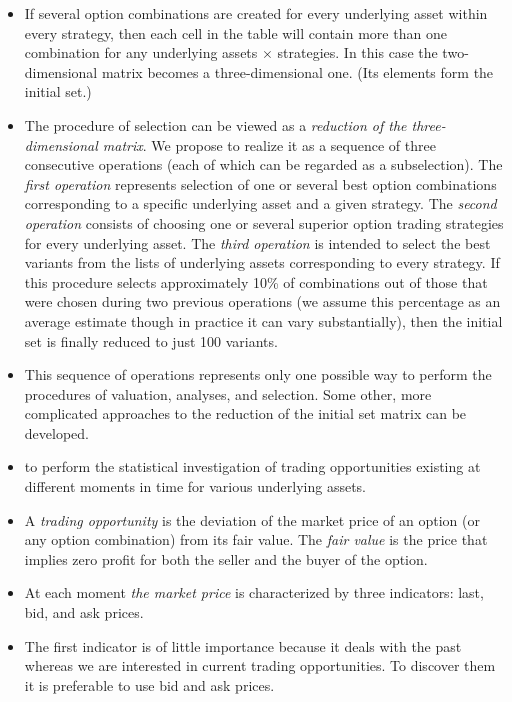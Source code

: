 \begin{itemize}
            \item If several option combinations are created for every underlying asset within every strategy, then each cell in the table will contain more than one combination for any {underlying assets $\times$ strategies}. In this case the two-dimensional matrix becomes a three-dimensional one. (Its elements form the initial set.)
            \item The procedure of selection can be viewed as a \textit{reduction of the three-dimensional matrix}. We propose to realize it as a sequence of three consecutive operations (each of which can be regarded as a subselection).
                \subitem The \textit{first operation} represents selection of one or several best option combinations corresponding to a specific underlying asset and a given strategy.
                \subitem The \textit{second operation} consists of choosing one or several superior option trading strategies for every underlying asset.
                \subitem The \textit{third operation} is intended to select the best variants from the lists of underlying assets corresponding to every strategy. If this procedure selects approximately 10\% of combinations out of those that were chosen during two previous operations (we assume this percentage as an average estimate though in practice it can vary substantially), then the initial set is finally reduced to just 100 variants.
            \item This sequence of operations represents only one possible way to perform the procedures of valuation, analyses, and selection. Some other, more complicated approaches to the reduction of the initial set matrix can be developed.
            \item to perform the statistical investigation of trading opportunities existing at different moments in time for various underlying assets.
            \item A \textit{trading opportunity} is the deviation of the market price of an option (or any option combination) from its fair value. The \textit{fair value} is the price that implies zero profit for both the seller and the buyer of the option.
            \item At each moment \textit{the market price} is characterized by three indicators: last, bid, and ask prices.
            \item The first indicator is of little importance because it deals with the past whereas we are interested in current trading opportunities. To discover them it is preferable to use bid and ask prices.

\end{itemize}
